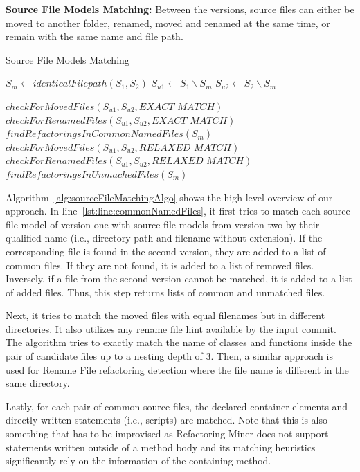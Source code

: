 \documentclass[letterpaper,12pt,onecolumn,final]{report}
\begin{document}
\textbf{Source File Models Matching:} 
Between the versions, source files can either be moved to another folder, renamed, moved and renamed at the same time, or remain with the same name and file path.
\begin{algorithm}
\DontPrintSemicolon
\caption{Source File Models Matching}\label{alg:algo1}
\label{alg:sourceFileMatchingAlgo}


$S_{m} \gets identicalFilepath(S_{1}, S_{2})$\; \label{lst:line:commonNamedFiles}
$S_{u1} \gets S_{1} \backslash S_{m}$\;
$S_{u2} \gets S_{2} \backslash S_{m}$\;

$checkForMovedFiles(S_{u1}, S_{u2}, EXACT\_MATCH)$\;
$checkForRenamedFiles(S_{u1}, S_{u2}, EXACT\_MATCH)$\;
$findRefactoringsInCommonNamedFiles(S_{m})$\;
$checkForMovedFiles(S_{u1}, S_{u2}, RELAXED\_MATCH)$\;
$checkForRenamedFiles(S_{u1}, S_{u2}, RELAXED\_MATCH)$\;
$findRefactoringsInUnmachedFiles(S_{m})$\;
\end{algorithm}

Algorithm~\ref{alg:sourceFileMatchingAlgo} shows the high-level overview of our approach. In line~\ref{lst:line:commonNamedFiles}, it first tries to match each source file model of version one with source file models from version two by their qualified name (i.e., directory path and filename without extension). If the corresponding file is found in the second version, they are added to a list of common files. If they are not found, it is added to a list of removed files. Inversely, if a file from the second version cannot be matched, it is added to a list of added files. Thus, this step returns lists of common and unmatched files.

Next, it tries to match the moved files with equal filenames but in different directories. It also utilizes any rename file hint available by the input commit. The algorithm tries to exactly match the name of classes and functions inside the pair of candidate files up to a nesting depth of 3. Then, a similar approach is used for Rename File refactoring detection where the file name is different in the same directory.

Lastly, for each pair of common source files, the declared container elements and directly written statements (i.e., scripts) are matched. Note that this is also something that has to be improvised as Refactoring Miner does not support statements written outside of a method body and its matching heuristics significantly rely on the information of the containing method.
\end{document}
